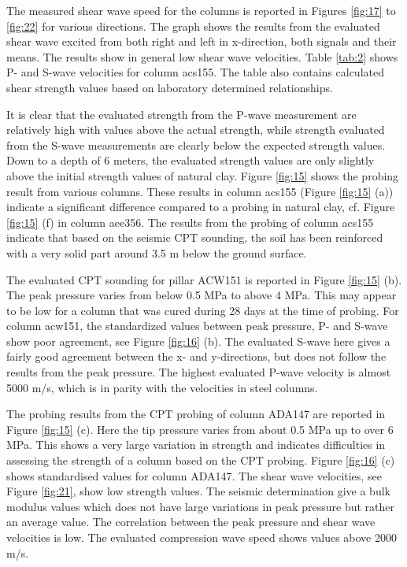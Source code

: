 \documentclass[final,3p,times,twocolumn]{elsarticle}
\begin{document}
The measured shear wave speed for the columns is reported in Figures \ref{fig:17} to \ref{fig:22} for various directions. The graph shows the results from the evaluated shear wave excited from both right and left in x-direction, both signals and their means. The results show in general low shear wave velocities. Table \ref{tab:2} shows P- and S-wave velocities for column acs155. The table also contains calculated shear strength values based on laboratory determined relationships.   
         
It is clear that the evaluated strength from the P-wave measurement are relatively high with values above the actual strength, while strength evaluated from the S-wave measurements are clearly below the expected strength values. Down to a depth of 6 meters, the evaluated strength values are only slightly above the initial strength values of natural clay. Figure \ref{fig:15} shows the probing result from various columns. These results in column acs155 (Figure \ref{fig:15} (a)) indicate a significant difference compared to a probing in natural clay, cf. Figure \ref{fig:15} (f) in column aee356. The results from the probing of column acs155 indicate that based on the seismic CPT sounding, the soil has been reinforced with a very solid part around 3.5 m below the ground surface.

The evaluated CPT sounding for pillar ACW151 is reported in Figure \ref{fig:15} (b). The peak pressure varies from below 0.5 MPa to above 4 MPa. This may appear to be low for a column that was cured during 28 days at the time of probing. For column acw151, the standardized values between peak pressure, P- and S-wave show poor agreement, see Figure \ref{fig:16} (b). The evaluated S-wave here gives a fairly good agreement between the x- and y-directions, but does not follow the results from the peak pressure. The highest evaluated P-wave velocity is almost 5000 m/s, which is in parity with the velocities in steel columns.

The probing results from the CPT probing of column ADA147 are reported in Figure \ref{fig:15} (c). Here the tip pressure varies from about 0.5 MPa up to over 6 MPa. This shows a very large variation in strength and indicates difficulties in assessing the strength of a column based on the CPT probing. Figure \ref{fig:16} (c) shows standardised values for column ADA147. The shear wave velocities, see Figure \ref{fig:21}, show low strength values. The seismic determination give a bulk modulus values which does not have large variations in peak pressure but rather an average value. The correlation between the peak pressure and shear wave velocities is low. The evaluated compression wave speed shows values above 2000 m/s.
\end{document}

